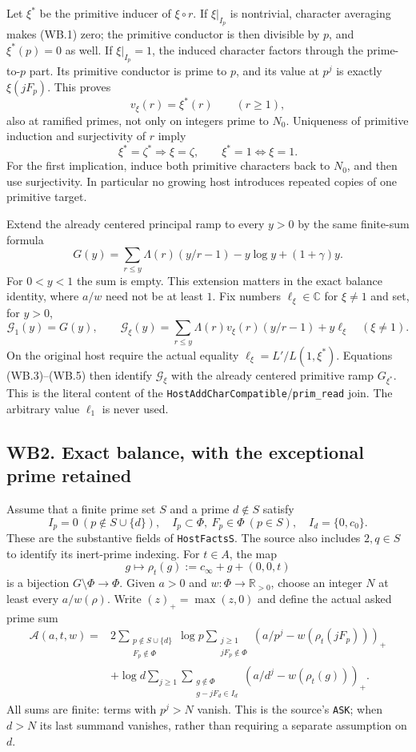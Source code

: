 Let $\xi^*$ be the primitive inducer of $\xi\circ r$. If
$\xi|_{I_p}$ is nontrivial, character averaging makes (WB.1) zero;
the primitive conductor is then divisible by $p$, and
$\xi^*(p)=0$ as well. If $\xi|_{I_p}=1$, the induced character
factors through the prime-to-$p$ part. Its primitive conductor is
prime to $p$, and its value at $p^j$ is exactly $\xi(jF_p)$.
This proves
\[
 v_\xi(r)=\xi^*(r)\qquad(r\ge1),
 \tag{WB.3}
\]
also at ramified primes, not only on integers prime to $N_0$.
Uniqueness of primitive induction and surjectivity of $r$ imply
\[
 \xi^*=\zeta^*\Longrightarrow\xi=\zeta,
 \qquad \xi^*=1\Longleftrightarrow\xi=1.
 \tag{WB.4}
\]
For the first implication, induce both primitive characters back to
$N_0$, and then use surjectivity. In particular no growing host
introduces repeated copies of one primitive target.

Extend the already centered principal ramp to every $y>0$ by the
same finite-sum formula
\[
 G(y)=\sum_{r\le y}\Lambda(r)(y/r-1)-y\log y+(1+\gamma)y.
\]
For $0<y<1$ the sum is empty. This extension matters in the exact
balance identity, where $a/w$ need not be at least $1$.
Fix numbers $\ell_\xi\in\mathbb C$ for $\xi\ne1$ and set, for
$y>0$,
\[
 \mathcal G_1(y)=G(y),\qquad
 \mathcal G_\xi(y)=\sum_{r\le y}\Lambda(r)v_\xi(r)(y/r-1)
                         +y\ell_\xi\quad(\xi\ne1).
 \tag{WB.5}
\]
On the original host require the actual equality
$\ell_\xi=L'/L(1,\xi^*)$. Equations (WB.3)--(WB.5) then identify
$\mathcal G_\xi$ with the already centered primitive ramp
$G_{\xi^*}$. This is the literal content of the
\texttt{HostAddCharCompatible}/\texttt{prim\_read} join.
The arbitrary value $\ell_1$ is never used.

\subsection{WB2. Exact balance, with the exceptional prime retained}

Assume that a finite prime set $S$ and a prime $d\notin S$ satisfy
\[
 I_p=0\ (p\notin S\cup\{d\}),\quad
 I_p\subset\Phi,\ F_p\in\Phi\ (p\in S),\quad
 I_d=\{0,c_0\}.
 \tag{WB.6}
\]
These are the substantive fields of \texttt{HostFactsS}. The source
also includes $2,q\in S$ to identify its inert-prime indexing.
For $t\in A$, the map
\[
 g\longmapsto\rho_t(g):=c_\infty+g+(0,0,t)
\]
is a bijection $G\setminus\Phi\to\Phi$. Given $a>0$ and
$w:\Phi\to\mathbb R_{>0}$, choose an integer $N$ at least every
$a/w(\rho)$. Write $(z)_+=\max(z,0)$ and define the actual asked
prime sum
\begin{align*}
 \mathcal A(a,t,w)={}&
 2\sum_{\substack{p\notin S\cup\{d\}\\F_p\notin\Phi}}
    \log p\sum_{\substack{j\ge1\\jF_p\notin\Phi}}
       (a/p^j-w(\rho_t(jF_p)))_+\\
 &+\log d\sum_{j\ge1}
       \sum_{\substack{g\notin\Phi\\g-jF_d\in I_d}}
          (a/d^j-w(\rho_t(g)))_+ .
 \tag{WB.7}
\end{align*}
All sums are finite: terms with $p^j>N$ vanish. This is the source's
\texttt{ASK}; when $d>N$ its last summand vanishes, rather than
requiring a separate assumption on $d$.

